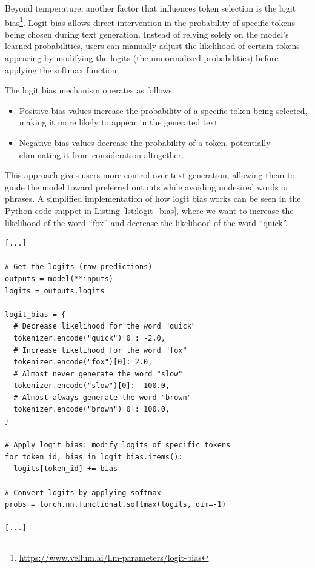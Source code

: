 Beyond temperature, another factor that influences token selection is the logit bias\footnote{\url{https://www.vellum.ai/llm-parameters/logit-bias}}.
Logit bias allows direct intervention in the probability of specific tokens being
chosen during text generation. Instead of relying solely on the model's learned
probabilities, users can manually adjust the likelihood of certain tokens appearing
by modifying the logits (the unnormalized probabilities) before applying the softmax
function.

The logit bias mechanism operates as follows:

\begin{itemize}
  \item Positive bias values increase the probability of a specific token being selected,
    making it more likely to appear in the generated text.

  \item Negative bias values decrease the probability of a token, potentially
    eliminating it from consideration altogether.
\end{itemize}

This approach gives users more control over text generation, allowing them to guide
the model toward preferred outputs while avoiding undesired words or phrases. A
simplified implementation of how logit bias works can be seen in the Python code
snippet in Listing \ref{lst:logit_bias}, where we want to increase the likelihood
of the word ``fox'' and decrease the likelihood of the word ``quick''.

\vspace{10mm}
\begin{codewindow}
    \begin{lstlisting}
[...]

# Get the logits (raw predictions)
outputs = model(**inputs)
logits = outputs.logits

logit_bias = {
  # Decrease likelihood for the word "quick"
  tokenizer.encode("quick")[0]: -2.0,
  # Increase likelihood for the word "fox"
  tokenizer.encode("fox")[0]: 2.0,
  # Almost never generate the word "slow"
  tokenizer.encode("slow")[0]: -100.0,
  # Almost always generate the word "brown"
  tokenizer.encode("brown")[0]: 100.0,
}

# Apply logit bias: modify logits of specific tokens
for token_id, bias in logit_bias.items():
  logits[token_id] += bias

# Convert logits by applying softmax
probs = torch.nn.functional.softmax(logits, dim=-1)

[...]
\end{lstlisting}
\end{codewindow}
\vspace{10mm}

